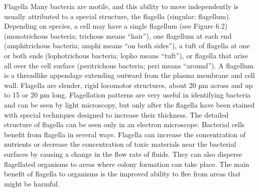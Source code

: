 \documentclass{article}
\begin{document}
Flagella Many bacteria are motile, and this ability to move
independently is usually attributed to a special structure, the flagella
(singular: flagellum). Depending on species, a cell may have a single
flagellum (see Figure 6.2) (monotrichous bacteria; trichous means
``hair''), one flagellum at each end (amphitrichous bacteria; amphi
means ``on both sides''), a tuft of flagella at one or both ends
(lophotrichous bacteria; lopho means ``tuft''), or flagella that arise
all over the cell surface (peritrichous bacteria; peri means
``around''). A flagellum is a threadlike appendage extending outward
from the plasma membrane and cell wall. Flagella are slender, rigid
locomotor structures, about 20 µm across and up to 15 or 20 µm long.
Flagellation patterns are very useful in identifying bacteria and can be
seen by light microscopy, but only after the flagella have been stained
with special techniques designed to increase their thickness. The
detailed structure of flagella can be seen only in an electron
microscope. Bacterial cells benefit from flagella in several ways.
Flagella can increase the concentration of nutrients or decrease the
concentration of toxic materials near the bacterial surfaces by causing
a change in the flow rate of fluids. They can also disperse flagellated
organisms to areas where colony formation can take place. The main
benefit of flagella to organisms is the improved ability to flee from
areas that might be harmful.
\end{document}
